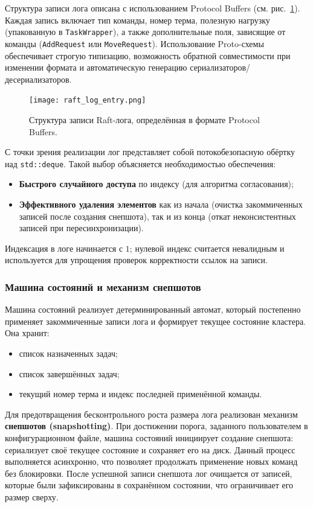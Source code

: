 Структура записи лога описана с использованием Protocol Buffers
(см. рис.~\ref{fig:raftlog}). Каждая запись включает тип команды,
номер терма, полезную нагрузку (упакованную в \texttt{TaskWrapper}),
а также дополнительные поля, зависящие от команды
(\texttt{AddRequest} или \texttt{MoveRequest}).
Использование Proto-схемы обеспечивает строгую типизацию,
возможность обратной совместимости при изменении формата и
автоматическую генерацию сериализаторов/десериализаторов.

\begin{figure}[h!]
    \centering
    \texttt{[image: raft\_log\_entry.png]}
    \caption{Структура записи Raft-лога, определённая в формате Protocol Buffers.}
    \label{fig:raftlog}
\end{figure}

С точки зрения реализации лог представляет собой потокобезопасную обёртку над
\texttt{std::deque}. Такой выбор объясняется необходимостью обеспечения:

\begin{itemize}
    \item \textbf{Быстрого случайного доступа} по индексу (для алгоритма согласования);
    \item \textbf{Эффективного удаления элементов} как из начала
    (очистка закоммиченных записей после создания снепшота),
    так и из конца (откат неконсистентных записей при пересинхронизации).
\end{itemize}

Индексация в логе начинается с $1$; нулевой индекс считается невалидным и
используется для упрощения проверок корректности ссылок на записи.

\subsubsection{Машина состояний и механизм снепшотов}

Машина состояний реализует детерминированный автомат, который постепенно
применяет закоммиченные записи лога и формирует текущее состояние кластера. Она
хранит:

\begin{itemize}
    \item список назначенных задач;
    \item список завершённых задач;
    \item текущий номер терма и индекс последней применённой команды.
\end{itemize}

Для предотвращения бесконтрольного роста размера лога реализован механизм
\textbf{снепшотов (snapshotting)}. При достижении порога, заданного
пользователем в конфигурационном файле, машина состояний инициирует создание
снепшота: сериализует своё текущее состояние и сохраняет его на диск. Данный
процесс выполняется асинхронно, что позволяет продолжать применение новых
команд без блокировки. После успешной записи снепшота лог очищается от записей,
которые были зафиксированы в сохранённом состоянии, что ограничивает его размер
сверху.

